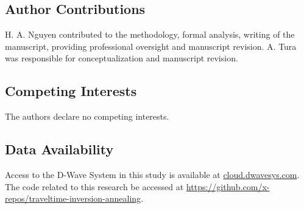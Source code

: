 \subsection{Author Contributions}

H. A. Nguyen contributed to the methodology, formal analysis, writing of the manuscript, providing professional oversight and manuscript revision. A. Tura was responsible for conceptualization and manuscript revision.

\subsection{Competing Interests}

The authors declare no competing interests.

\subsection{Data Availability}

Access to the D-Wave System in this study is available at \href{https://cloud.dwavesys.com}{cloud.dwavesys.com}. The code related to this research be accessed at \href{https://github.com/x-repos/traveltime-inversion-annealing}{https://github.com/x-repos/traveltime-inversion-annealing}.
